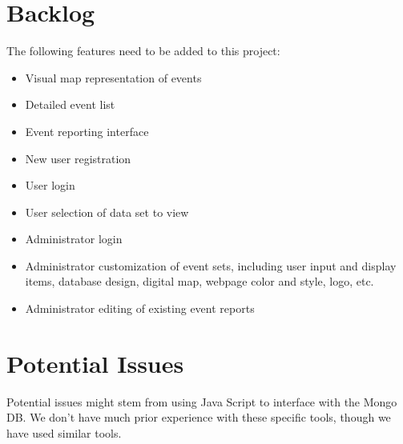 \section{Backlog}
The following features need to be added to this project:
\begin{itemize}
\item Visual map representation of events
\item Detailed event list
\item Event reporting interface
\item New user registration
\item User login
\item User selection of data set to view
\item Administrator login
\item Administrator customization of event sets, including user input and display items, database design, digital map, webpage color and style, logo, etc. 
\item Administrator editing of existing event reports
\end{itemize}
\section{Potential Issues}
Potential issues might stem from using Java Script to interface with the Mongo DB. We don't have much prior experience with these specific tools, though we have used similar tools.